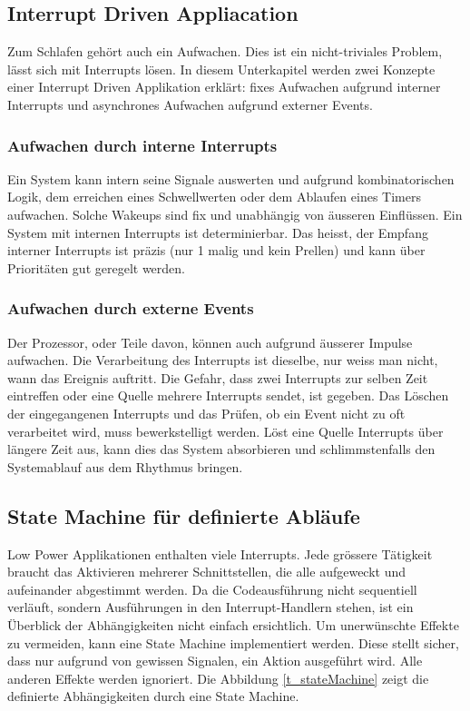 \subsection{Interrupt Driven Appliacation}\label{pm_interrupt} 
Zum Schlafen gehört auch ein Aufwachen. Dies ist ein nicht-triviales Problem, lässt sich mit Interrupts lösen. In diesem Unterkapitel werden zwei Konzepte einer Interrupt Driven Applikation erklärt: fixes Aufwachen aufgrund interner Interrupts und asynchrones Aufwachen aufgrund externer Events.

\subsubsection{Aufwachen durch interne Interrupts}
Ein System kann intern seine Signale auswerten und aufgrund kombinatorischen Logik, dem erreichen eines Schwellwerten oder dem Ablaufen eines Timers aufwachen. Solche Wakeups sind fix und unabhängig von äusseren Einflüssen. Ein System mit internen Interrupts ist determinierbar. Das heisst, der Empfang interner Interrupts ist präzis (nur 1 malig und kein Prellen) und kann über Prioritäten gut geregelt werden.

\subsubsection{Aufwachen durch externe Events}
Der Prozessor, oder Teile davon, können auch aufgrund äusserer Impulse aufwachen. Die Verarbeitung des Interrupts ist dieselbe, nur weiss man nicht, wann das Ereignis auftritt. Die Gefahr, dass zwei Interrupts zur selben Zeit eintreffen oder eine Quelle mehrere Interrupts sendet, ist gegeben. Das Löschen der eingegangenen Interrupts und das Prüfen, ob ein Event nicht zu oft verarbeitet wird, muss bewerkstelligt werden. Löst eine Quelle Interrupts über längere Zeit aus, kann dies das System absorbieren und schlimmstenfalls den Systemablauf aus dem Rhythmus bringen.

\newpage
\subsection{State Machine für definierte Abläufe}\label{pm_state_machine} 
Low Power Applikationen enthalten viele Interrupts. Jede grössere Tätigkeit braucht das Aktivieren mehrerer Schnittstellen, die alle aufgeweckt und aufeinander abgestimmt werden. Da die Codeausführung nicht sequentiell verläuft, sondern Ausführungen in den Interrupt-Handlern stehen, ist ein Überblick der Abhängigkeiten nicht einfach ersichtlich. Um unerwünschte Effekte zu vermeiden, kann eine State Machine implementiert werden. Diese stellt sicher, dass nur aufgrund von gewissen Signalen, ein Aktion ausgeführt wird. Alle anderen Effekte werden ignoriert. Die Abbildung \ref{t_stateMachine} zeigt die definierte Abhängigkeiten durch eine State Machine.

